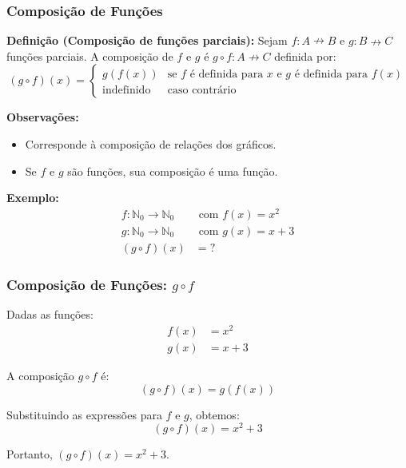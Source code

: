 \begin{frame}
  \frametitle{Composição de Funções}

  \textbf{Definição (Composição de funções parciais):}
  Sejam \( f: A \nrightarrow B \) e \( g: B \nrightarrow C \) funções parciais.
  A composição de \( f \) e \( g \) é \( g \circ f: A \nrightarrow C \) definida por:
  \[
  (g \circ f)(x) = 
  \begin{cases} 
  g(f(x)) & \text{se } f \text{ é definida para } x \text{ e } g \text{ é definida para } f(x) \\
  \text{indefinido} & \text{caso contrário}
  \end{cases}
  \]

  \textbf{Observações:}
  \begin{itemize}
    \item Corresponde à composição de relações dos gráficos.
    \item Se \( f \) e \( g \) são funções, sua composição é uma função.
  \end{itemize}

  \textbf{Exemplo:}
  \begin{align*}
  f : \mathbb{N}_0 \rightarrow \mathbb{N}_0 & \text{ com } f(x) = x^2 \\
  g : \mathbb{N}_0 \rightarrow \mathbb{N}_0 & \text{ com } g(x) = x + 3 \\
  (g \circ f)(x) & = ?
  \end{align*}
\end{frame}

\begin{frame}
  \frametitle{Composição de Funções: \(g \circ f\)}
  
  Dadas as funções:
  \begin{align*}
    f(x) &= x^2 \\
    g(x) &= x + 3
  \end{align*}
  
  A composição \(g \circ f\) é:
  \[ (g \circ f)(x) = g(f(x)) \]
  
  Substituindo as expressões para \(f\) e \(g\), obtemos:
  \[ (g \circ f)(x) = x^2 + 3 \]
  
  Portanto, \((g \circ f)(x) = x^2 + 3\).
\end{frame}


